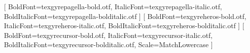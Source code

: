

%
\usepackage{fontspec}
\setmainfont{texgyrepagella-regular.otf}[
  BoldFont=texgyrepagella-bold.otf,
  ItalicFont=texgyrepagella-italic.otf,
  BoldItalicFont=texgyrepagella-bolditalic.otf
]
\setsansfont{texgyreheros-regular.otf}[
  BoldFont=texgyreheros-bold.otf,
  ItalicFont=texgyreheros-italic.otf,
  BoldItalicFont=texgyreheros-bolditalic.otf
]
\setmonofont{texgyrecursor-regular.otf}[
  BoldFont=texgyrecursor-bold.otf,
  ItalicFont=texgyrecursor-italic.otf,
  BoldItalicFont=texgyrecursor-bolditalic.otf,
  Scale=MatchLowercase
]

%
\usepackage{graphicx}
\providecommand{\ascentlogo}{logo-ascent.png}
\providecommand{\ascentintitule}{Forensique réseau}
\providecommand{\ascentjour}{}
\providecommand{\ascentdate}{}
\providecommand{\ascenttheme}{}
\providecommand{\ascentorganisme}{DGFIP}
\providecommand{\ascentprestataire}{Ascent Formation}
\providecommand{\ascentlieu}{Paris}

